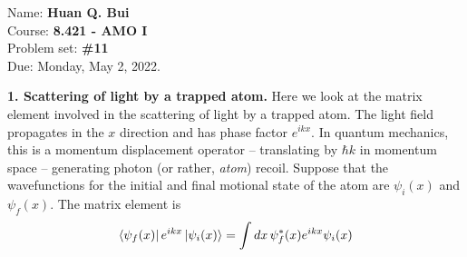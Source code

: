 \documentclass{article}
\theoremstyle{definition}
\begin{document}
\begin{framed}
\noindent Name: \textbf{Huan Q. Bui}\\
Course: \textbf{8.421 - AMO I}\\
Problem set: \textbf{\#11}\\
Due: Monday, May 2, 2022.
\end{framed}




\noindent \textbf{1. Scattering of light by a trapped atom.} Here we look at the matrix element involved in the scattering of light by a trapped atom. The light field propagates in the $x$ direction and has phase factor $e^{ikx}$. In quantum mechanics, this is a momentum displacement operator -- translating by $\hbar k$ in momentum space -- generating photon (or rather, \textit{atom}) recoil. Suppose that the wavefunctions for the initial and final motional state of the atom are $\psi_i(x)$ and $\psi_f(x)$. The matrix element is 
\begin{align*}
\bra{\psi_f(x)} e^{ikx} \ket{\psi_i(x)} = \int dx\,  \psi_f^*(x) e^{ikx} \psi_i(x) 
\end{align*} 
\end{document}
